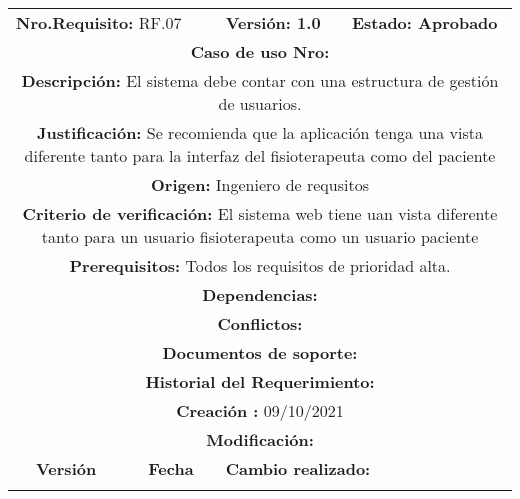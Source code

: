 \begin{center}
\begin{tabular}{|c|c|p{4cm}|p{4cm}|}
            \hline
            \rowcolor{red} \multicolumn{4}{|c|}{\textbf{Prioridad:} Alta}  \\
            \hline
            \multicolumn{2}{|l}{\textbf{Nro.Requisito: }RF.07} & \multicolumn{1}{|l}{\textbf{Versión: 1.0}} & \multicolumn{1}{|l|}{\textbf{Estado: Aprobado}} \\
            \multicolumn{4}{|p{13cm}|}{\textbf{Caso de uso Nro: }}  \\
            \hline
            \multicolumn{4}{|p{13cm}|}{\textbf{Descripción: } El sistema debe contar con una estructura de gestión de usuarios. } \\
            \multicolumn{4}{|p{13cm}|}{\textbf{Justificación: } Se recomienda que la aplicación tenga una vista diferente tanto para la interfaz del fisioterapeuta como del paciente } \\ 
            \multicolumn{4}{|p{13cm}|}{\textbf{Origen: }Ingeniero de requsitos}  \\
            \multicolumn{4}{|p{13cm}|}{\textbf{Criterio de verificación: } El sistema web tiene uan vista diferente tanto para un usuario fisioterapeuta como un usuario paciente  } \\
            \hline
            \multicolumn{4}{|p{13cm}|}{\textbf{Prerequisitos: } Todos los requisitos de prioridad alta. }\\
            \hline \multicolumn{4}{|p{12cm}|}{\textbf{Dependencias: }
                }  \\
            \multicolumn{4}{|p{12cm}|}{\textbf{Conflictos: }}  \\
            \hline
            \multicolumn{4}{|p{12cm}|}{\textbf{Documentos de soporte: }}  \\
            \hline
            \multicolumn{4}{|p{12cm}|}{\textbf{Historial del Requerimiento: }}  \\
            \multicolumn{4}{|p{12cm}|}{\textbf{Creación : }09/10/2021}  \\
            \multicolumn{4}{|p{12cm}|}{\textbf{Modificación: }}  \\
             \textbf{Versión} & \textbf{Fecha} & \multicolumn{2}{p{8cm}|}{\textbf{Cambio realizado:}} \\
            \hline
               & &   \multicolumn{2}{p{8cm}|}{}
              \\
            \hline
\end{tabular}





\end{center}
